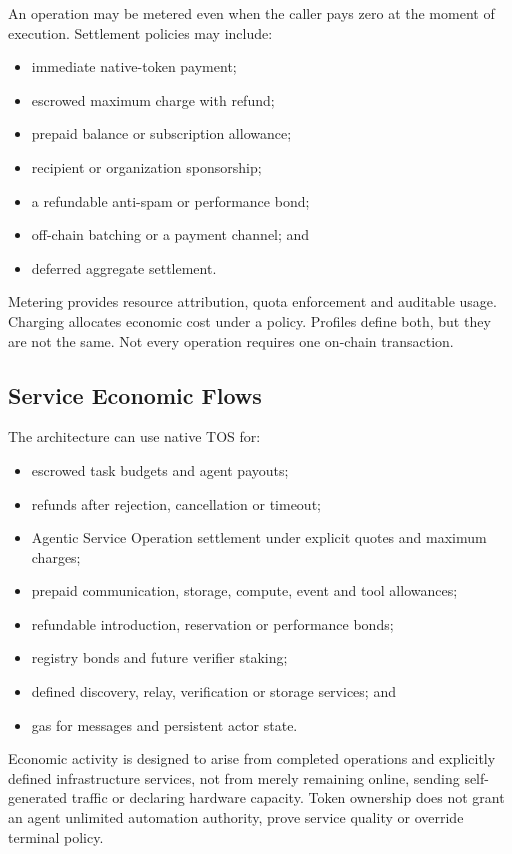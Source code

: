 \documentclass[11pt,oneside]{article}
\begin{document}
An operation may be metered even when the caller pays zero at the moment of execution.
Settlement policies may include:

\begin{itemize}
  \item immediate native-token payment;
  \item escrowed maximum charge with refund;
  \item prepaid balance or subscription allowance;
  \item recipient or organization sponsorship;
  \item a refundable anti-spam or performance bond;
  \item off-chain batching or a payment channel; and
  \item deferred aggregate settlement.
\end{itemize}

Metering provides resource attribution, quota enforcement and auditable usage. Charging
allocates economic cost under a policy. Profiles define both, but they are not the same.
Not every operation requires one on-chain transaction.

\subsection{Service Economic Flows}

The architecture can use native TOS for:

\begin{itemize}
  \item escrowed task budgets and agent payouts;
  \item refunds after rejection, cancellation or timeout;
  \item Agentic Service Operation settlement under explicit quotes and maximum charges;
  \item prepaid communication, storage, compute, event and tool allowances;
  \item refundable introduction, reservation or performance bonds;
  \item registry bonds and future verifier staking;
  \item defined discovery, relay, verification or storage services; and
  \item gas for messages and persistent actor state.
\end{itemize}

Economic activity is designed to arise from completed operations and explicitly defined
infrastructure services, not from merely remaining online, sending self-generated traffic or
declaring hardware capacity. Token ownership does not grant an agent unlimited automation authority, prove
service quality or override terminal policy.
\end{document}
